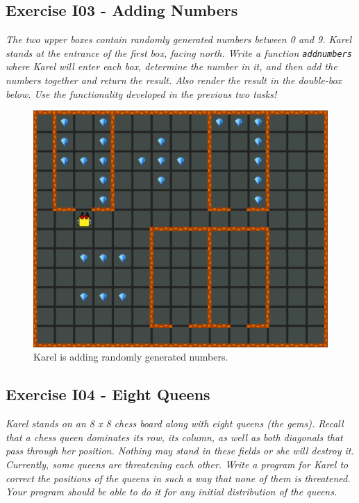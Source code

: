 {{{{\subsection{Exercise I03 - Adding Numbers}

{\em The two upper boxes contain randomly generated numbers between 0 and 9. Karel stands at the entrance of the first box,
facing north. Write a function {\tt addnumbers} where Karel will enter each box, determine the number in it,
and then add the numbers together and return the result. Also render the result in the double-box below. 
Use the functionality developed in the previous two tasks!}\\[-7mm]


\begin{figure}[!ht]
\begin{center}
\includegraphics[height=0.4\textwidth]{imgk/i03.png}
\end{center}
\vspace{-4mm}
\caption{Karel is adding randomly generated numbers.}
\label{fig:g12}
\end{figure}
\noindent

\subsection{Exercise I04 - Eight Queens}

{\em Karel stands on an 8 x 8 chess board along with eight queens (the gems). Recall that a chess queen dominates its row, its column, as well as both diagonals that pass through her position. Nothing may stand in these fields or she will destroy it. Currently, some queens are threatening each other. Write a program for Karel to correct the positions of the queens in such a way that none of them is threatened. Your program should be able to do it for any initial distribution of the queens. }

}}}}
